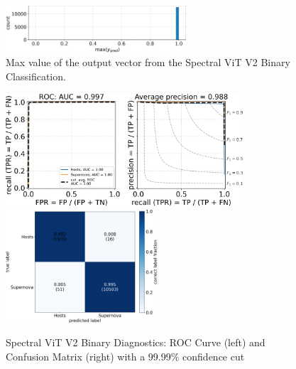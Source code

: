\begin{figure}
    \centering
    \includegraphics[width=0.6\textwidth]{figures/v2_real/vit_model_V2max_ypred_binary_26.png}
    \caption{Max value of the output vector from the Spectral ViT V2 Binary Classification.\label{fig:cnn_max}}
\end{figure}



\begin{figure}
    \centering
    \includegraphics[height=4.2cm]{figures/v2_real/vit_model_V2roc9999_binary_e26.png}
    \quad
    \includegraphics[height=4.2cm]{figures/v2_real/vit_model_V2cm9999_binary_e26.png}
    \caption{Spectral ViT V2 Binary Diagnostics: ROC Curve (left) and Confusion Matrix (right) with a 99.99\% confidence
    cut \label{fig:cnn_qual}}
\end{figure}

